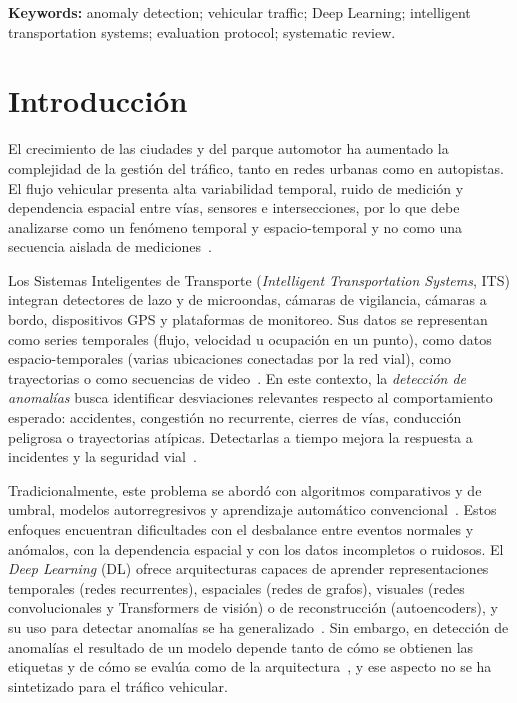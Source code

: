 \documentclass[12pt, a4paper]{article}
\begin{document}
\noindent\textbf{Keywords:} anomaly detection; vehicular traffic; Deep Learning; intelligent transportation systems; evaluation protocol; systematic review.

\section{Introducción}
\label{sec:intro}

El crecimiento de las ciudades y del parque automotor ha aumentado la complejidad de la gestión del tráfico, tanto en redes urbanas como en autopistas. El flujo vehicular presenta alta variabilidad temporal, ruido de medición y dependencia espacial entre vías, sensores e intersecciones, por lo que debe analizarse como un fenómeno temporal y espacio-temporal y no como una secuencia aislada de mediciones~\cite{djenouri2019survey,zhang2020urban}.

Los Sistemas Inteligentes de Transporte (\textit{Intelligent Transportation Systems}, ITS) integran detectores de lazo y de microondas, cámaras de vigilancia, cámaras a bordo, dispositivos GPS y plataformas de monitoreo. Sus datos se representan como series temporales (flujo, velocidad u ocupación en un punto), como datos espacio-temporales (varias ubicaciones conectadas por la red vial), como trayectorias o como secuencias de video~\cite{djenouri2019survey,santhosh2020anomaly}. En este contexto, la \textit{detección de anomalías} busca identificar desviaciones relevantes respecto al comportamiento esperado: accidentes, congestión no recurrente, cierres de vías, conducción peligrosa o trayectorias atípicas. Detectarlas a tiempo mejora la respuesta a incidentes y la seguridad vial~\cite{elsahly2022systematic,razi2023deep}.

Tradicionalmente, este problema se abordó con algoritmos comparativos y de umbral, modelos autorregresivos y aprendizaje automático convencional~\cite{elsahly2022systematic,olugbade2022review}. Estos enfoques encuentran dificultades con el desbalance entre eventos normales y anómalos, con la dependencia espacial y con los datos incompletos o ruidosos. El \textit{Deep Learning} (DL) ofrece arquitecturas capaces de aprender representaciones temporales (redes recurrentes), espaciales (redes de grafos), visuales (redes convolucionales y Transformers de visión) o de reconstrucción (autoencoders), y su uso para detectar anomalías se ha generalizado~\cite{darban2024deep}. Sin embargo, en detección de anomalías el resultado de un modelo depende tanto de cómo se obtienen las etiquetas y de cómo se evalúa como de la arquitectura~\cite{darban2024deep,kapoor2024reforms}, y ese aspecto no se ha sintetizado para el tráfico vehicular.
\end{document}
